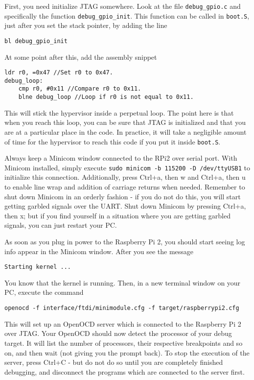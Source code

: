 \documentclass[a4paper,11pt,reqno]{amsart}
\begin{document}
First, you need initialize JTAG somewhere. Look at the file \texttt{debug\_gpio.c} and specifically the function \texttt{debug\_gpio\_init}. This function can be called in \texttt{boot.S}, just after you set the stack pointer, by adding the line

\begin{verbatim}
bl debug_gpio_init
\end{verbatim}

At some point after this, add the assembly snippet

\begin{verbatim}
ldr r0, =0x47 //Set r0 to 0x47.
debug_loop:
	cmp r0, #0x11 //Compare r0 to 0x11.
	blne debug_loop //Loop if r0 is not equal to 0x11.
\end{verbatim}

This will stick the hypervisor inside a perpetual loop. The point here is that when you reach this loop, you can be sure that JTAG is initialized and that you are at a particular place in the code. In practice, it will take a negligible amount of time for the hypervisor to reach this code if you put it inside \texttt{boot.S}.

Always keep a Minicom window connected to the RPi2 over serial port. With Minicom installed, simply execute \texttt{sudo minicom -b 115200 -D /dev/ttyUSB1} to initialize this connection. Additionally, press Ctrl+a, then w and Ctrl+a, then u to enable line wrap and addition of carriage returns when needed. Remember to shut down Minicom in an orderly fashion - if you do not do this, you will start getting garbled signals over the UART. Shut down Minicom by pressing Ctrl+a, then x; but if you find yourself in a situation where you are getting garbled signals, you can just restart your PC.

As soon as you plug in power to the Raspberry Pi 2, you should start seeing log info appear in the Minicom window. After you see the message

\begin{verbatim}
Starting kernel ...
\end{verbatim}

You know that the kernel is running. Then, in a new terminal window on your PC, execute the command

\begin{verbatim}
openocd -f interface/ftdi/minimodule.cfg -f target/raspberrypi2.cfg
\end{verbatim}

This will set up an OpenOCD server which is connected to the Raspberry Pi 2 over JTAG. Your OpenOCD should now detect the processor of your debug target. It will list the number of processors, their respective breakpoints and so on, and then wait (not giving you the prompt back). To stop the execution of the server, press Ctrl+C - but do not do so until you are completely finished debugging, and disconnect the programs which are connected to the server first.
\end{document}

